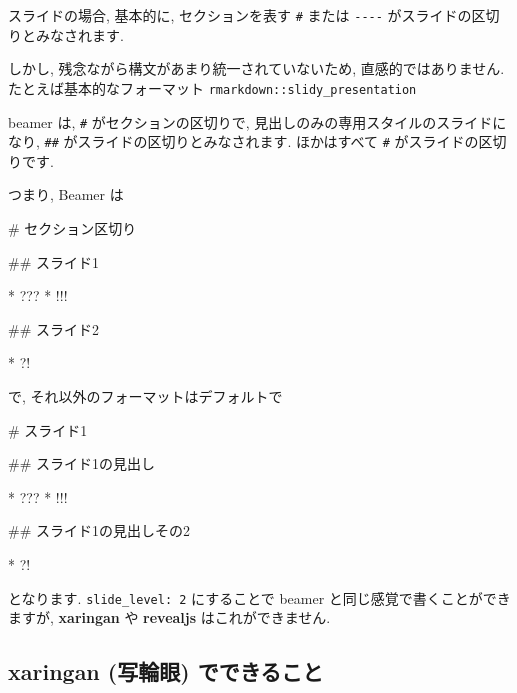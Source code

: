 \documentclass[
]{ltjsarticle}
\newenvironment{Shaded}{\begin{snugshade}}{\end{snugshade}}
\newcommand{\FunctionTok}[1]{\textcolor[rgb]{0.00,0.00,0.00}{#1}}
\newcommand{\NormalTok}[1]{#1}
\newcommand{\SpecialStringTok}[1]{\textcolor[rgb]{0.31,0.60,0.02}{#1}}
\begin{document}
スライドの場合, 基本的に, セクションを表す \texttt{\#} または \texttt{-\/-\/-\/-} がスライドの区切りとみなされます.

しかし, 残念ながら構文があまり統一されていないため, 直感的ではありません. たとえば基本的なフォーマット \texttt{rmarkdown::slidy\_presentation}

beamer は, \texttt{\#} がセクションの区切りで, 見出しのみの専用スタイルのスライドになり, \texttt{\#\#} がスライドの区切りとみなされます. ほかはすべて \texttt{\#} がスライドの区切りです.

つまり, Beamer は

\begin{Shaded}
\begin{Highlighting}[]
\FunctionTok{\# セクション区切り}

\FunctionTok{\#\# スライド1}

\SpecialStringTok{* }\NormalTok{???}
\SpecialStringTok{* }\NormalTok{!!!}

\FunctionTok{\#\# スライド2}

\SpecialStringTok{* }\NormalTok{?!}
\end{Highlighting}
\end{Shaded}

で, それ以外のフォーマットはデフォルトで

\begin{Shaded}
\begin{Highlighting}[]
\FunctionTok{\# スライド1}

\FunctionTok{\#\# スライド1の見出し}

\SpecialStringTok{* }\NormalTok{???}
\SpecialStringTok{* }\NormalTok{!!!}

\FunctionTok{\#\# スライド1の見出しその2}

\SpecialStringTok{* }\NormalTok{?!}
\end{Highlighting}
\end{Shaded}

となります. \texttt{slide\_level:\ 2} にすることで beamer と同じ感覚で書くことができますが, \textbf{xaringan} や \textbf{revealjs} はこれができません.

\hypertarget{xaringan-ux5199ux8f2aux773c-ux3067ux3067ux304dux308bux3053ux3068}{%
\subsection{\texorpdfstring{\textbf{xaringan} (写輪眼) でできること}{xaringan (写輪眼) でできること}}\label{xaringan-ux5199ux8f2aux773c-ux3067ux3067ux304dux308bux3053ux3068}}
\end{document}
